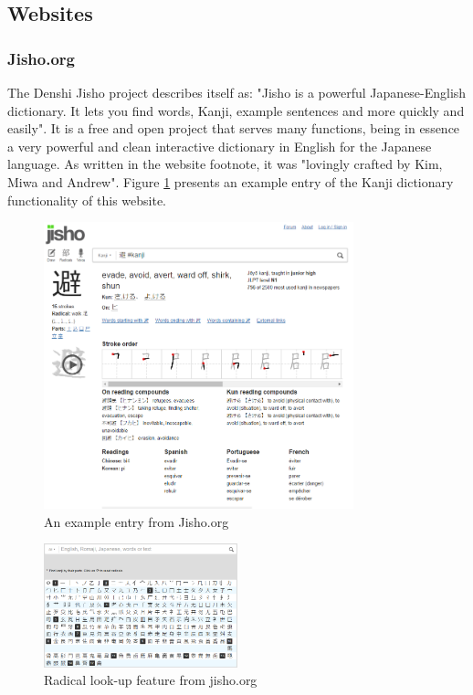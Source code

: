 \subsection{Websites}

\subsubsection{Jisho.org}

The Denshi Jisho project\cite{jishoorg} describes itself as: "Jisho is a powerful Japanese-English dictionary. It lets you find words, Kanji, example sentences and more quickly and easily". It is a free and open project that serves many functions, being in essence a very powerful and clean interactive dictionary in English for the Japanese language. As written in the website footnote, it was "lovingly crafted by Kim, Miwa and Andrew". Figure \ref{fig:jisho} presents an example entry of the Kanji dictionary functionality of this website.

\begin{figure}[ht]
    \centering
    \includegraphics[width=0.8\textwidth]{Cap1/DenshiJisho}
    \caption{An example entry from Jisho.org}
    \label{fig:jisho}
\end{figure}

\begin{figure}[ht]
    \centering
    \includegraphics[width=0.5\textwidth]{Cap1/RadicalSearch}
    \caption{Radical look-up feature from jisho.org}
    \label{fig:jishoradsearch}
\end{figure}

